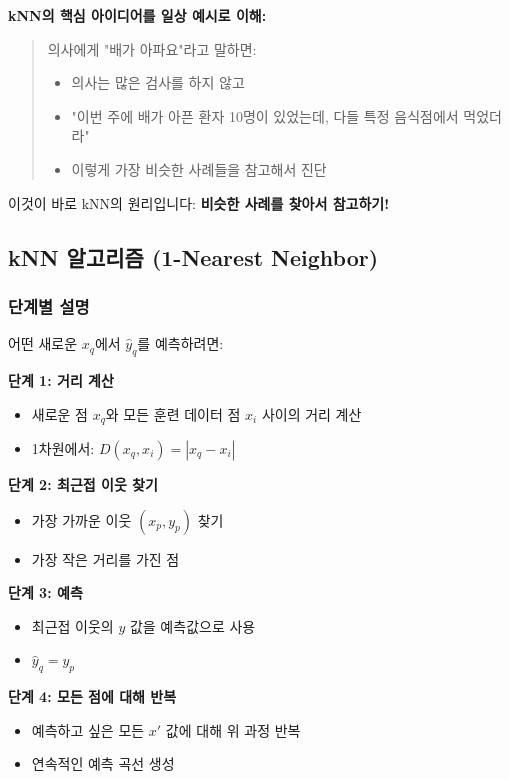 \documentclass[12pt,a4paper]{article}
\begin{document}
\textbf{kNN의 핵심 아이디어를 일상 예시로 이해:}

\begin{quote}
의사에게 "배가 아파요"라고 말하면:
\begin{itemize}
    \item 의사는 많은 검사를 하지 않고
    \item "이번 주에 배가 아픈 환자 10명이 있었는데, 다들 특정 음식점에서 먹었더라"
    \item 이렇게 가장 비슷한 사례들을 참고해서 진단
\end{itemize}
\end{quote}

이것이 바로 kNN의 원리입니다: \textbf{비슷한 사례를 찾아서 참고하기!}

\subsection{kNN 알고리즘 (1-Nearest Neighbor)}

\subsubsection{단계별 설명}

어떤 새로운 $x_q$에서 $\hat{y}_q$를 예측하려면:

\textbf{단계 1: 거리 계산}
\begin{itemize}
    \item 새로운 점 $x_q$와 모든 훈련 데이터 점 $x_i$ 사이의 거리 계산
    \item 1차원에서: $D(x_q, x_i) = |x_q - x_i|$
\end{itemize}

\textbf{단계 2: 최근접 이웃 찾기}
\begin{itemize}
    \item 가장 가까운 이웃 $(x_p, y_p)$ 찾기
    \item 가장 작은 거리를 가진 점
\end{itemize}

\textbf{단계 3: 예측}
\begin{itemize}
    \item 최근접 이웃의 $y$ 값을 예측값으로 사용
    \item $\hat{y}_q = y_p$
\end{itemize}

\textbf{단계 4: 모든 점에 대해 반복}
\begin{itemize}
    \item 예측하고 싶은 모든 $x'$ 값에 대해 위 과정 반복
    \item 연속적인 예측 곡선 생성
\end{itemize}
\end{document}
